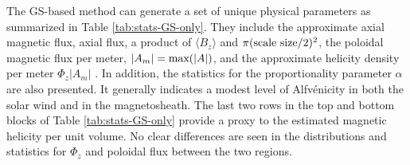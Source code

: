 \begin{table}
    \centering
    \caption[Statistical values for the physical quantities of structures identified with GS-based analysis analysis]{Statistical values for the physical quantities of the structures identified with the GS-based analysis. Top: magnetosheath; bottom: solar wind.}
    
    \label{tab:stats-GS}
\end{table}

The GS-based method can generate a set of unique physical parameters \citep{Hu:2017} as summarized in Table \ref{tab:stats-GS-only}. They include the approximate axial magnetic flux, \gls{axial flux}, a product of $\langle B_z\rangle$ and $\pi(\textnormal{scale size}/2)^2$, the poloidal magnetic flux per meter, $|A_m| = \textnormal{max}(|A|)$, and the approximate helicity density per meter $\Phi_z|A_m|$ \citep{Hu:2014}. In addition, the statistics for the proportionality parameter $\alpha$ are also presented. It generally indicates a modest level of Alfv\'enicity in both the solar wind and in the magnetosheath. The last two rows in the top and bottom blocks of Table \ref{tab:stats-GS-only} provide a proxy to the estimated magnetic helicity per unit volume. No clear differences are seen in the distributions and statistics for $\Phi_z$ and \gls{poloidal flux} between the two regions.
\begin{table}[hb!]
    \caption[Statistical values for the physical quantities of SFR structures identified solely via the GS-based method]{Statistical values for the physical quantities characterizing the SFR structures identified solely via the GS-based method in the two regions. Top: magnetosheath; bottom: solar wind.}
    \centering
    
    \label{tab:stats-GS-only}
\end{table}


